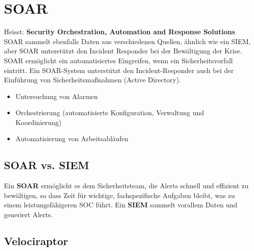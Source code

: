 \section{SOAR}
Heisst: \textbf{Security Orchestration, Automation and Response Solutions}\\

SOAR sammelt ebenfalls Daten aus verschiedenen Quellen, ähnlich wie ein SIEM, aber SOAR unterstützt den Incident Responder bei der Bewältigung der Krise.
SOAR ermöglicht ein automatisiertes Eingreifen, wenn ein Sicherheitsvorfall eintritt.
Ein SOAR-System unterstützt den Incident-Responder auch bei der Einführung von Sicherheitsmaßnahmen (Active Directory).
\begin{itemize}
  \item Untersuchung von Alarmen
  \item Orchestrierung (automatisierte Konfiguration, Verwaltung und Koordinierung)
  \item Automatisierung von Arbeitsabläufen
\end{itemize}

\subsection{SOAR vs. SIEM}
Ein \textbf{SOAR} ermöglicht es dem Sicherheitsteam, die Alerts schnell und effizient zu bewältigen, so dass Zeit für wichtige, fachspezifische Aufgaben bleibt, was zu einem leistungsfähigeren SOC führt.
Ein \textbf{SIEM} sammelt vorallem Daten und generiert Alerts.

\subsection{Velociraptor}

